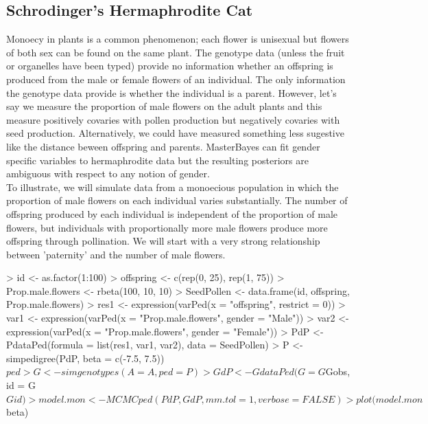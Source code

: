 \documentclass{article}
\begin{document}
\subsection{Schrodinger's Hermaphrodite Cat}
\label{SHC}

Monoecy in plants is a common phenomenon; each flower is unisexual but flowers of both sex can be found on the same plant.  The genotype data (unless the fruit or organelles have been typed) provide no information whether an offspring is produced from the male or female flowers of an individual. The only information the genotype data provide is whether the individual is a parent.  However, let's say we measure the proportion of male flowers on the adult plants and this measure positively covaries with pollen production but negatively covaries with seed production.  Alternatively, we could have measured something less sugestive like the distance beween offspring and parents.  MasterBayes can fit gender specific variables to hermaphrodite data but the resulting posteriors are ambiguous with respect to any notion of gender.\\

  To illustrate, we will simulate data from a monoecious population in which the proportion of male flowers on each individual varies substantially. The number of offspring produced by each individual is independent of the proportion of male flowers, but individuals with proportionally more male flowers produce more offspring through pollination.  We will start with a very strong relationship between 'paternity' and the number of male flowers.
 
\begin{Schunk}
\begin{Sinput}
> id <- as.factor(1:100)
> offspring <- c(rep(0, 25), rep(1, 75))
> Prop.male.flowers <- rbeta(100, 10, 10)
> SeedPollen <- data.frame(id, offspring, Prop.male.flowers)
> res1 <- expression(varPed(x = "offspring", restrict = 0))
> var1 <- expression(varPed(x = "Prop.male.flowers", gender = "Male"))
> var2 <- expression(varPed(x = "Prop.male.flowers", gender = "Female"))
> PdP <- PdataPed(formula = list(res1, var1, var2), data = SeedPollen)
> P <- simpedigree(PdP, beta = c(-7.5, 7.5))$ped
> G <- simgenotypes(A = A, ped = P)
> GdP <- GdataPed(G = G$Gobs, id = G$Gid)
> model.mon <- MCMCped(PdP, GdP, mm.tol = 1, verbose = FALSE)
> plot(model.mon$beta)
\end{Sinput}
\end{Schunk}
\end{document}
